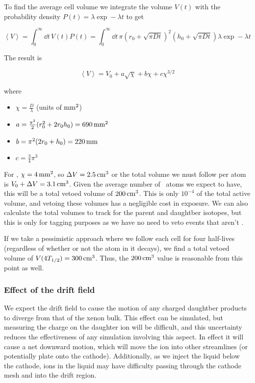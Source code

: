 To find the average cell volume we integrate the volume $V(t)$ with the probability density $P(t) = \lambda \exp -\lambda t$ to get

\begin{equation}
\left< V \right> = \int_0^{\infty} \dd t\,V(t) P(t) = \int_0^{\infty} \dd t\,\pi(r_0 + \sqrt{\pi Dt})^2(h_0 + \sqrt{\pi Dt})\lambda\exp -\lambda t
\end{equation}

The result is

\begin{equation}
\left< V \right> = V_0 + a\sqrt{\chi} + b\chi + c\chi^{3/2}
\end{equation}

where
\begin{itemize}
    \item $\chi = \frac{D}{\lambda}$ (units of $\mathrm{mm^2}$)
    \item $a = \frac{\pi^{2}}{2} (r_0^2+2 r_0 h_0) = 690\,\mathrm{mm^2}$
    \item $b = \pi^2 (2r_0 + h_0) = 220\,\mathrm{mm}$
    \item $c = \frac{3}{4} \pi^{3}$
\end{itemize}

For \Pb, $\chi = 4\,\mathrm{mm^2}$, so $\Delta V = 2.5\,\mathrm{cm^3}$ or the total volume we must follow per atom is $V_0 + \Delta V = 3.1\,\mathrm{cm^3}$. Given the average number of \Pb~atoms we expect to have, this will be a total vetoed volume of $200\,\mathrm{cm^3}$. This is only $10^{-4}$ of the total active volume, and vetoing these volumes has a negligible cost in exposure. We can also calculate the total volumes to track for the parent and daughtber isotopes, but this is only for tagging purposes as we have no need to veto events that aren't \Pb.

If we take a pessimistic approach where we follow each cell for four half-lives (regardless of whether or not the atom in it decays), we find a total vetoed volume of $V(4T_{1/2}) = 300\,\mathrm{cm^3}$. Thus, the $200\,\mathrm{cm^3}$ value is reasonable from this point as well.

\subsubsection{Effect of the drift field}

We expect the drift field to cause the motion of any charged daughtber products to diverge from that of the xenon bulk. This effect can be simulated, but measuring the charge on the daughter ion will be difficult, and this uncertainty reduces the effectiveness of any simulation involving this aspect. In effect it will cause a net downward motion, which will move the ion into other streamlines (or potentially plate onto the cathode). Additionally, as we inject the liquid below the cathode, ions in the liquid may have difficulty passing through the cathode mesh and into the drift region.

